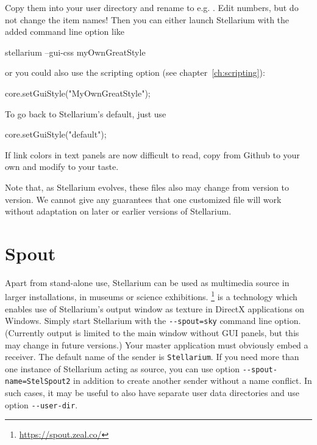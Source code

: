 Copy them into your user directory
and rename to e.g. . Edit numbers, but do
not change the item names! Then you can either launch Stellarium with
the added command line option like
\begin{commands}
  stellarium --gui-css myOwnGreatStyle
\end{commands}
or you could also use the scripting option (see chapter~\ref{ch:scripting}):
\begin{script}
  core.setGuiStyle("MyOwnGreatStyle");
\end{script}
To go back to Stellarium's default, just use
\begin{script}
  core.setGuiStyle("default");
\end{script}

If link colors in text panels are now difficult to read, copy
 from Github to your own 
 and modify to your taste.

Note that, as Stellarium evolves, these files also may change from
version to version. We cannot give any guarantees that one customized
file will work without adaptation on later or earlier versions of Stellarium.


\section{Spout} 
\label{sec:CommandLineOptions:Special:Spout}
Apart from stand-alone use, Stellarium can be used as multimedia source in larger installations, in museums or science exhibitions. 
\footnote{\url{https://spout.zeal.co/}} is a technology which enables use of Stellarium's 
output window as texture in DirectX applications on Windows. Simply start Stellarium with 
the \texttt{-\/-spout=sky} command line option. (Currently  output is limited to the main window 
without GUI panels, but this may change in future versions.) 
Your master application must obviously embed a  receiver. 
The default name of the  sender is \texttt{Stellarium}. If you need more than one instance of Stellarium acting as source, 
you can use option \texttt{-\/-spout-name=StelSpout2} in addition to create another  sender without a name conflict. 
In such cases, it may be useful to also have separate user data directories and use option \texttt{-\/-user-dir}. 

